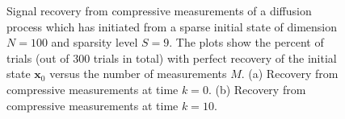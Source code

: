 \documentclass[11pt,draftcls,onecolumn]{IEEEtran}
\newcommand{\vc}[1]{\boldsymbol{#1}}
\begin{document}
\begin{figure}[tb]
\centering
{}
\caption{
Signal recovery from compressive measurements of a diffusion process which has initiated from a sparse initial state of dimension $N = 100$ and sparsity level $S = 9$. The plots show the percent of trials (out of $300$ trials in total) with perfect recovery of the initial state $\vc{x}_0$ versus the number of measurements $M$. (a) Recovery from compressive measurements at time $k=0$. (b) Recovery from compressive measurements at time $k=10$.
}
\label{fig:TwoDimDiffRecoveryTest2_Tvec_0_1}
\end{figure}
\end{document}
